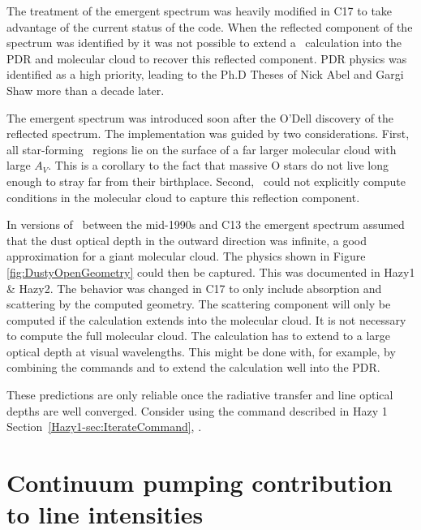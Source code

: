 The treatment of the emergent spectrum was heavily modified in C17 
to take advantage of the current status of the code.
When the reflected component of the spectrum was identified by \citet{1992ApJ...399L..67O} 
it was not possible to extend a \Cloudy\ calculation into the PDR and molecular cloud
to recover this reflected component.
PDR physics was identified as a high priority, leading to the Ph.D Theses of 
Nick Abel \citep{Abel2005} and Gargi Shaw \citep{Shaw2005} more than a decade later.  

The emergent spectrum was introduced soon after the O'Dell discovery of the reflected spectrum.
The implementation was guided by two considerations.  First, all star-forming \hii\ regions
lie on the surface of a far larger molecular cloud with large $A_V$.  This is a corollary to the fact that massive
O stars do not live long enough to stray far from their birthplace.  Second, \Cloudy\
could not explicitly compute conditions in the molecular cloud to capture this reflection component.

In versions of \Cloudy\ between the mid-1990s and C13 the emergent spectrum assumed that
the dust optical depth in the outward direction was infinite, a good approximation for a giant molecular cloud.
The physics shown in Figure \ref{fig:DustyOpenGeometry}  could  then be captured.
This was documented in Hazy1 \& Hazy2.
The behavior was changed in C17 to only include absorption and scattering by the computed geometry.
The scattering component will only be computed if the calculation extends into the molecular cloud.
It is not necessary to compute the full molecular cloud.
The calculation has to extend to a large
optical depth at visual wavelengths.  
This might be done with, for example, by combining the commands
 and  to extend the
calculation well into the PDR.

These predictions are only reliable once the radiative transfer and line optical depths are 
well converged.  
Consider using the  command described in Hazy 1
Section~\ref{Hazy1-sec:IterateCommand},
.

\section{Continuum pumping contribution to line intensities}

